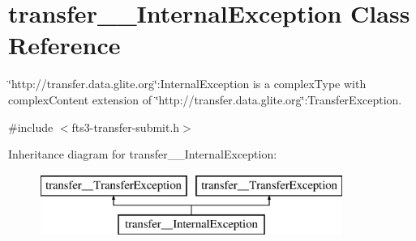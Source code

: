 \section{transfer\_\-\_\-InternalException Class Reference}
\label{classtransfer____InternalException}


\char`\"{}http://transfer.data.glite.org\char`\"{}:InternalException is a complexType with complexContent extension of \char`\"{}http://transfer.data.glite.org\char`\"{}:TransferException.  




{\ttfamily \#include $<$fts3-\/transfer-\/submit.h$>$}

Inheritance diagram for transfer\_\-\_\-InternalException:\begin{figure}[H]
\begin{center}
\leavevmode
\includegraphics[height=2.000000cm]{classtransfer____InternalException}
\end{center}
\end{figure}
